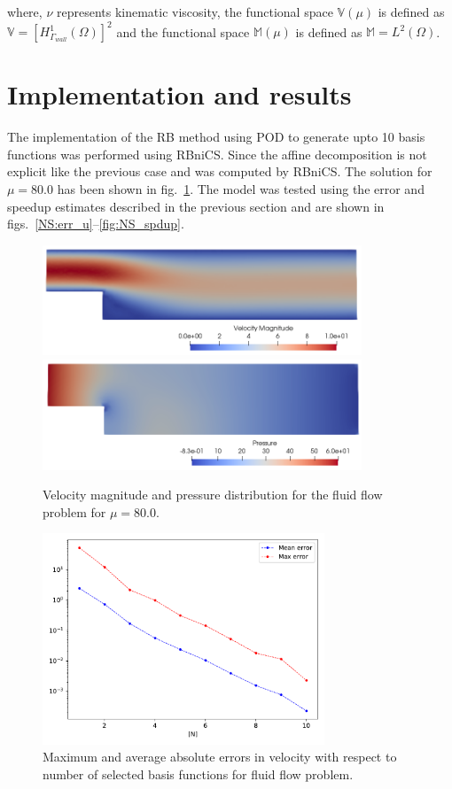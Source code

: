 \documentclass[11pt, oneside]{article}
\begin{document}
where, $\nu$ represents kinematic viscosity, the functional space $\mathbb{V}(\mu)$ is defined as $\mathbb{V}=[H^1_{\Gamma_{wall}}(\Omega)]^2$ and the functional space $\mathbb{M}(\mu)$ is defined as $\mathbb{M}=L^2(\Omega)$.

\section{Implementation and results}
The implementation of the RB method using POD to generate upto 10 basis functions was performed using RBniCS. Since the affine decomposition is not explicit like the previous case and was computed by RBniCS. The solution for $\mu = 80.0$ has been shown in fig.~\ref{fig:NS_up}. The model was tested using the error and speedup estimates described in the previous section and are shown in figs.~\ref{NS:err_u}--\ref{fig:NS_spdup}.
\begin{figure}
    \centering
    \includegraphics[width=0.85\textwidth]{figures/NS_velocity.png}\\
    \includegraphics[width=0.85\textwidth]{figures/NS_pressure.png}
    \caption{Velocity magnitude and pressure distribution for the fluid flow problem for ${\mu} = 80.0$.}
    \label{fig:NS_up}
\end{figure}

\begin{figure}[h!]
    \centering
    \includegraphics[width=0.75\textwidth]{figures/output_error_u.pdf}
    \caption{Maximum and average absolute errors in velocity with respect to number of selected basis functions for fluid flow problem.}
    \label{fig:NS_err_u}
\end{figure}
\end{document}
